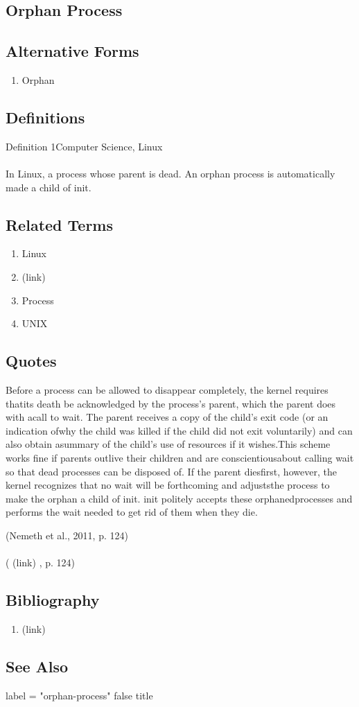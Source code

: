 \newpage \subsection*{Orphan Process } \subsection*{Alternative Forms } \begin{enumerate} \item  Orphan  \end{enumerate} \subsection*{Definitions } \begin{DIC_Def}{Definition 1Computer Science, Linux }{} \paragraph{} In Linux, a process whose parent is dead. An orphan process is automatically made a child of init.  \end{DIC_Def} \subsection*{Related Terms } \begin{enumerate} \item  Linux  \item  (link) \href{Orphan (Dictionary Entry) }{ }   \item  Process  \item  UNIX  \end{enumerate} \subsection*{Quotes } \begin{DIC_BlockQuote} Before a process can be allowed to disappear completely, the kernel requires thatits death be acknowledged by the process's parent, which the parent does with acall to wait. The parent receives a copy of the child's exit code (or an indication ofwhy the child was killed if the child did not exit voluntarily) and can also obtain asummary of the child's use of resources if it wishes.This scheme works fine if parents outlive their children and are conscientiousabout calling wait so that dead processes can be disposed of. If the parent diesfirst, however, the kernel recognizes that no wait will be forthcoming and adjuststhe process to make the orphan a child of init. init politely accepts these orphanedprocesses and performs the wait needed to get rid of them when they die.  \end{DIC_BlockQuote} (Nemeth et al., 2011, p. 124)  \paragraph{} (  (link) \href{Nemeth et al., 2011 }{ } , p. 124)  \subsection*{Bibliography } \begin{enumerate} \item  (link) \href{Nemeth et al., 2011 }{ }   \end{enumerate} \subsection*{See Also } label = "orphan-process"  false  title  